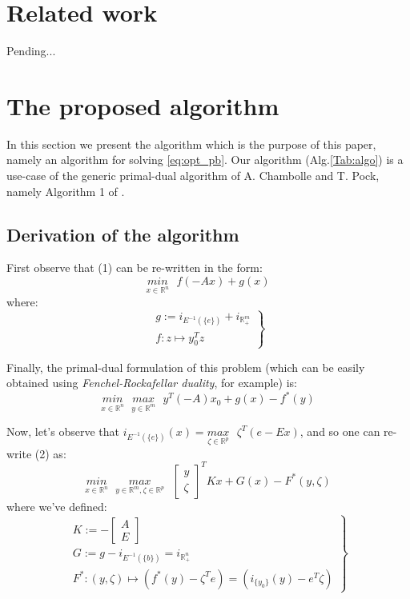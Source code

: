 \documentclass[a4paper,10pt,journal]{IEEEtran}
\begin{document}
\section{Related work}
\label{sec:related_work}

Pending...

\section{The proposed algorithm}
\label{sec:algo}
In this section we present the algorithm which is the purpose of this paper, namely an algorithm
for solving \eqref{eq:opt_pb}. Our algorithm (Alg.\ref{Tab:algo}) is a use-case of
the generic primal-dual algorithm of A. Chambolle and T. Pock, namely Algorithm 1 of \cite{chambolle2010}.

\subsection{Derivation of the algorithm}
First observe that (1) can be re-written in the form:
\begin{equation}
  \underset{x \in \mathbb{R}^n}{min}\text{ }{f(-Ax) + g(x)}
\end{equation}
where:\\
\begin{equation}
  \left.
  \begin{aligned}
    g := i_{E^{-1}(\{e\})} + i_{\mathbb{R}_{+}^m}\\
    f: z \mapsto y_0^Tz
    \end{aligned}
  \right\}
\end{equation}

Finally, the primal-dual formulation of this problem (which can be easily obtained using
\textit{Fenchel-Rockafellar duality}, for example) is:
\begin{equation}
  \underset{x \in \mathbb{R}^n}{min}\text{ }\underset{y \in \mathbb{R}^m}{max}\text{ }{y^T(-A)x_0 + g(x) - f^*(y)}
\end{equation}

Now, let's observe that $i_{E^{-1}(\{e\})}(x) = \underset{\zeta \in \mathbb{R}^p}{max}\text{ }\zeta^T(e - Ex)$, and so one can re-write (2) as:
\begin{equation}
  \underset{x \in \mathbb{R}^n}{min}\text{ }\underset{y \in \mathbb{R}^m, \zeta \in \mathbb{R}^p}{max}\text{ }
  \begin{bmatrix}y\\\zeta\end{bmatrix}^TKx + G(x) - F^*(y, \zeta)
  \label{eq:pd_opt}
\end{equation}
where we've defined:
\begin{equation}
  \left.
  \begin{aligned}
    K := -\begin{bmatrix}A\\E\end{bmatrix}\\
    G := g - i_{E^{-1}(\{b\})} = i_{\mathbb{R}_{+}^n}\\
    F^*: (y, \zeta) \mapsto (f^*(y) - \zeta^Te) = (i_{\{y_0\}}(y) - e^T\zeta)
  \end{aligned}
  \right\}
\end{equation}
\end{document}
